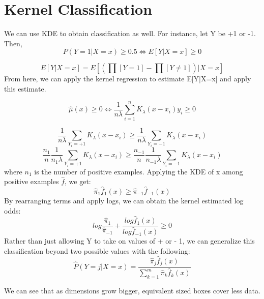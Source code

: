 \documentclass[a4paper]{article}
\begin{document}
\section{Kernel Classification}
We can use KDE to obtain classification as well. For instance, let Y be +1 or -1. Then,
$$ P(Y=1|X=x)\geq 0.5 \Longleftrightarrow E[Y|X=x]\geq 0 $$

$$E[Y|X=x] = E[(\prod[Y=1]-\prod[Y\neq 1])|X=x] $$
From here, we can apply the kernel regression to estimate E[Y|X=x] and apply this estimate.


$$\hat\mu(x) \geq 0 \Longleftrightarrow  \frac{1}{n\lambda}\sum_{i=1}^n K_{\lambda} (x-x_{i})y_{i} \geq 0 $$

$$\frac{1}{n\lambda}\sum_{Y_{i}=+1} K_{\lambda} (x-x_{i}) \geq  \frac{1}{n\lambda}\sum_{Y_{i}=-1} K_{\lambda} (x-x_{i})   $$
$$\frac{n_{1}}{n}\frac{1}{n_{1}\lambda}\sum_{Y_{i}=+1} K_{\lambda} (x-x_{i}) \geq  \frac{n_{-1}}{n}\frac{1}{n_{-1}\lambda}\sum_{Y_{i}=-1} K_{\lambda} (x-x_{i})   $$
where $n_1$ is the number of positive examples. Applying the KDE of x among positive examples $\hat f$, we get:
$$\hat\pi_1\hat f_1(x) \geq \hat\pi_{-1}\hat f_{-1}(x) $$
By rearranging terms and apply logs, we can obtain the kernel estimated log odds:
$$log\frac{\hat\pi_1}{\hat\pi_{-1}} + \frac{log\hat f_1(x)}{log\hat f_{-1}(x)} \geq 0$$
Rather than just allowing Y to take on values of + or - 1, we can generalize this classification beyond two possible values with the following:
$$\hat P(Y=j | X=x) = \frac{\hat\pi_j\hat f_j(x)}{\sum_{k=1}^m\hat\pi_k \hat f_k(x)}$$

We can see that as dimensions grow bigger, equivalent sized boxes cover less data.
\end{document}
